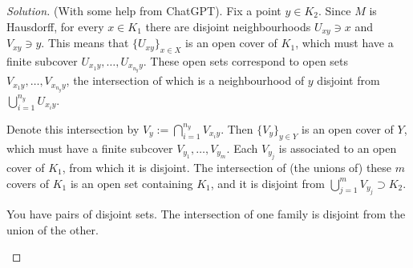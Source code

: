 \begin{proof}[Solution]\leavevmode
	(With some help from {\color{6}ChatGPT}). Fix a point \(y \in K_2\). Since \(M\) is Hausdorff, for every \(x \in K_1\) there are disjoint neighbourhoods \(U_{xy} \ni x\) and \(V_{xy} \ni y\). This means that \( \{U_{xy}\}_{x \in X}\) is an open cover of \(K_1\), which must have a finite subcover \(U_{x_1y},\ldots,U_{x_{n_y}y}\). These open sets correspond to open sets \(V_{x_1y},\ldots,V_{x_{n_y}y}\), {\color{6}the intersection of which is a neighbourhood of $y$ disjoint from \(\bigcup_{i=1}^{n_{y}}U_{x_iy}\).}

Denote this intersection by \(V_y:=\bigcap_{i=1}^{n_{y}}V_{x_iy}\). Then \(\{V_y\}_{y \in Y}\) is an open cover of \(Y\), which must have a finite subcover \(V_{y_1},\ldots,V_{y_m}\). Each \(V_{y_j}\) is associated to an open cover of \(K_1\), from which it is disjoint. The intersection of (the unions of) these \(m\) covers of \(K_1\) is an open set containing \(K_1\), and it is disjoint from \(\bigcup_{j=1}^mV_{y_j} \supset K_2\).

\begin{upshot}\leavevmode
	You have pairs of disjoint sets. The intersection of one family is disjoint from the union of the other.
\end{upshot}
\end{proof}
\iffalse
